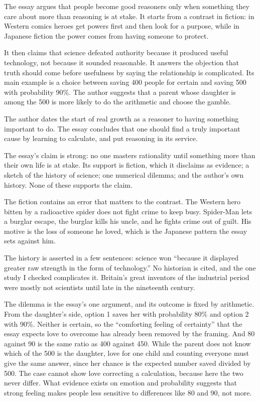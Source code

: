 \begin{afterword}
\summaryhead

The essay argues that people become good reasoners only when something they care about more than reasoning is at stake. It starts from a contrast in fiction: in Western comics heroes get powers first and then look for a purpose, while in Japanese fiction the power comes from having someone to protect.

It then claims that science defeated authority because it produced useful technology, not because it sounded reasonable. It answers the objection that truth should come before usefulness by saying the relationship is complicated. Its main example is a choice between saving 400 people for certain and saving 500 with probability 90\%. The author suggests that a parent whose daughter is among the 500 is more likely to do the arithmetic and choose the gamble.

The author dates the start of real growth as a reasoner to having something important to do. The essay concludes that one should find a truly important cause by learning to calculate, and put reasoning in its service.

\responsehead

The essay's claim is strong: no one masters rationality until something more than their own life is at stake. Its support is fiction, which it disclaims as evidence; a sketch of the history of science; one numerical dilemma; and the author's own history. None of these supports the claim.

The fiction contains an error that matters to the contrast. The Western hero bitten by a radioactive spider does not fight crime to keep busy. Spider-Man lets a burglar escape, the burglar kills his uncle, and he fights crime out of guilt. His motive is the loss of someone he loved, which is the Japanese pattern the essay sets against him.

The history is asserted in a few sentences: science won ``because it displayed greater raw strength in the form of technology.'' No historian is cited, and the one study I checked complicates it. Britain's great inventors of the industrial period were mostly not scientists until late in the nineteenth century.

The dilemma is the essay's one argument, and its outcome is fixed by arithmetic. From the daughter's side, option 1 saves her with probability 80\% and option 2 with 90\%. Neither is certain, so the ``comforting feeling of certainty'' that the essay expects love to overcome has already been removed by the framing. And 80 against 90 is the same ratio as 400 against 450. While the parent does not know which of the 500 is the daughter, love for one child and counting everyone must give the same answer, since her chance is the expected number saved divided by 500. The case cannot show love correcting a calculation, because here the two never differ. What evidence exists on emotion and probability suggests that strong feeling makes people less sensitive to differences like 80 and 90, not more.


\end{afterword}
